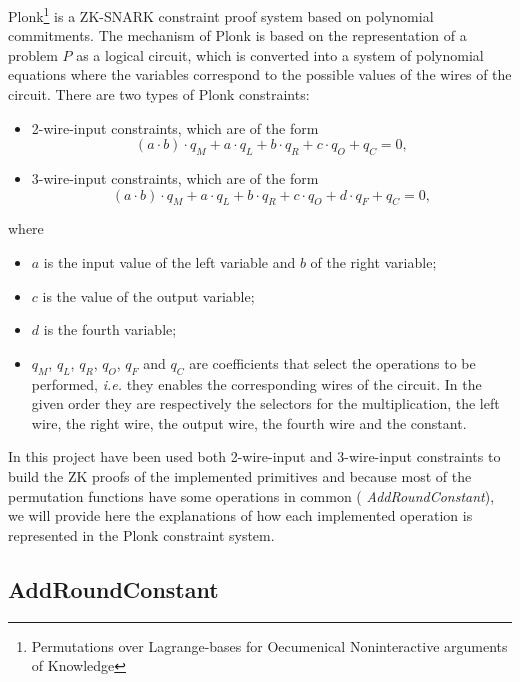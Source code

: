 \documentclass[12pt, a4paper]{report}
\begin{document}
\textsf{Plonk}\footnote{Permutations over Lagrange-bases for Oecumenical Noninteractive arguments of Knowledge} is a ZK-SNARK constraint proof system based on polynomial commitments.
The mechanism of \textsf{Plonk} is based on the representation of a problem $P$ as a logical circuit, which is converted into a system of polynomial equations where the variables correspond to the possible values of the wires of the circuit.
There are two types of \textsf{Plonk} constraints:
\begin{itemize}
  \item 2-wire-input constraints, which are of the form
    \begin{equation}
      (a \cdot b) \cdot q_M + a \cdot q_L + b \cdot q_R + c \cdot q_O + q_C = 0 ,
      \label{eq:2inconstraint}
    \end{equation}
  \item 3-wire-input constraints, which are of the form
    \begin{equation}
      (a \cdot b) \cdot q_M + a \cdot q_L + b \cdot q_R + c \cdot q_O + d \cdot q_F + q_C = 0 ,
      \label{eq:2inconstraint}
    \end{equation}
\end{itemize}
where
\begin{itemize}
  \item $a$ is the input value of the left variable and $b$ of the right variable;
  \item $c$ is the value of the output variable;
  \item $d$ is the fourth variable;
  \item $q_M$, $q_L$, $q_R$, $q_O$, $q_F$ and $q_C$ are coefficients that select the operations to be performed, \textsl{i.e.} they enables the corresponding wires of the circuit. In the given order they are respectively the selectors for the multiplication, the left wire, the right wire, the output wire, the fourth wire and the constant.
\end{itemize}
In this project have been used both 2-wire-input and 3-wire-input constraints to build the ZK proofs of the implemented primitives and because most of the permutation functions have some operations in common ( \textit{AddRoundConstant}), we will provide here the explanations of how each implemented operation is represented in the \textsf{Plonk} constraint system.

\subsection{AddRoundConstant}\label{subsec:arc}
\end{document}
